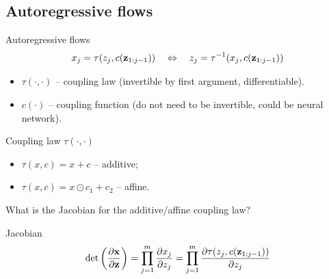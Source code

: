 \subsection{Autoregressive flows}
\begin{frame}{Autoregressive flows}
	\vspace{-0.3cm}
	\[
	x_j = \tau (z_j, c(\mathbf{z}_{1:j-1})) \quad \Leftrightarrow \quad z_j = \tau^{-1} (x_j, c(\mathbf{z}_{1:j-1}))
	\]
	\vspace{-0.3cm}
	\begin{itemize}
		\item $\tau (\cdot, \cdot)$ -- coupling law (invertible by first argument, differentiable).
		\item $c(\cdot)$ -- coupling function (do not need to be invertible, could be neural network).
	\end{itemize}
	\begin{block}{Coupling law $\tau(\cdot, \cdot)$}
		\begin{itemize}
			\item $\tau(x, c) = x + c$ -- additive;
			\item $\tau(x, c) = x \odot c_1 + c_2$ -- affine.
		\end{itemize}
	\end{block}
	What is the Jacobian for the additive/affine coupling law? 
	\begin{block}{Jacobian}
		\vspace{-0.3cm}
		\[
		\det \left( \frac{\partial \mathbf{x}}{\partial \mathbf{z}} \right) = \prod_{j=1}^m \frac{\partial x_j}{\partial z_j} = \prod_{j=1}^m \frac{\partial \tau (z_j, c(\mathbf{z}_{1:j-1})) }{\partial z_j}
		\]
		\vspace{-0.3cm}
	\end{block}
	
\end{frame}

